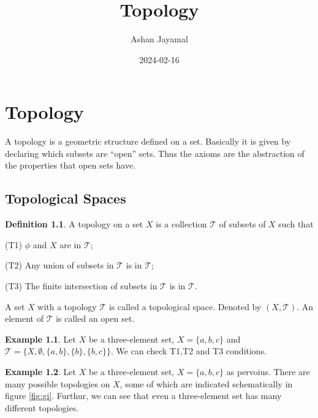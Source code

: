 \documentclass[
]{book}
\title{Topology}
\author{Ashan Jayamal}
\date{2024-02-16}
\theoremstyle{definition}
\newtheorem{definition}{Definition}[chapter]
\theoremstyle{definition}
\newtheorem{example}{Example}[chapter]
\theoremstyle{definition}
\theoremstyle{definition}
\theoremstyle{remark}
\begin{document}
\maketitle

{
\setcounter{tocdepth}{1}
\tableofcontents
}
\hypertarget{topology}{%
\chapter{Topology}\label{topology}}

A topology is a geometric structure defined on a set. Basically it is given by declaring which subsets are ``open'' sets. Thus the axioms are the abstraction of the properties that open sets have.

\hypertarget{topological-spaces}{%
\section{Topological Spaces}\label{topological-spaces}}

\begin{definition}
\protect\hypertarget{def:Top}{}\label{def:Top}A topology on a set \(X\) is a collection \(\mathcal{T}\) of subsets of \(X\) such that

(T1) \(\phi\) and \(X\) are in \(\mathcal{T}\);

(T2) Any union of subsets in \(\mathcal{T}\) is in \(\mathcal{T}\);

(T3) The finite intersection of subsets in \(\mathcal{T}\) is in \(\mathcal{T}\).
\end{definition}

A set \(X\) with a topology \(\mathcal{T}\) is called a topological space. Denoted by \((X,\mathcal{T})\). An element of \(\mathcal{T}\) is called an open set.

\begin{example}
\protect\hypertarget{exm:unnamed-chunk-1}{}\label{exm:unnamed-chunk-1}Let \(X\) be a three-element set, \(X = \{a, b, c\}\) and \(\mathcal{T}=\{X, \emptyset,\{a, b\}, \{b\}, \{b, c\}\}\). We can check T1,T2 and T3 conditions.
\end{example}

\begin{example}
\protect\hypertarget{exm:unnamed-chunk-2}{}\label{exm:unnamed-chunk-2}Let \(X\) be a three-element set, \(X = \{a, b, c\}\) as pervoius. There are many possible topologies on \(X\), some of which are indicated schematically in figure \ref{fig:gi}. Furthur, we can see that even a three-element set has many different topologies.
\end{example}
\end{document}

